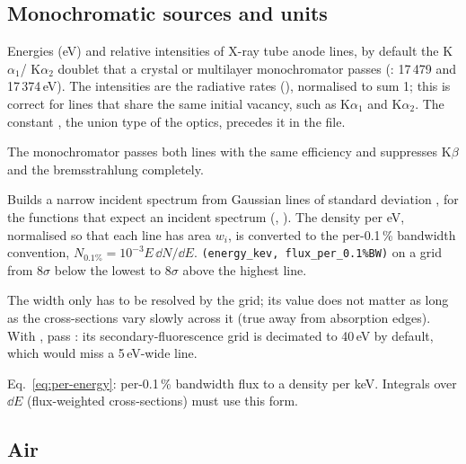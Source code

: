 \subsection{Monochromatic sources and units}

Energies (eV) and relative intensities of X-ray tube anode lines, by default the K$\alpha_1$/
K$\alpha_2$ doublet that a crystal or multilayer monochromator passes (:
17\,479 and 17\,374\,eV). The intensities are the radiative rates (), normalised
to sum 1; this is correct for lines that share the same initial vacancy, such as K$\alpha_1$
and K$\alpha_2$. The constant , the union type of the optics, precedes it
in the file.
\begin{hyp}
The monochromator passes both lines with the same efficiency and suppresses K$\beta$ and the
bremsstrahlung completely.
\end{hyp}

Builds a narrow incident spectrum from Gaussian lines of standard deviation ,
for the functions that expect an incident spectrum (,
). The density per eV, normalised so that each line has area $w_i$, is
converted to the per-0.1\,\% bandwidth convention, $N_{0.1\%} = 10^{-3}E\,\dd N/\dd E$.
 \texttt{(energy\_kev, flux\_per\_0.1\%BW)} on a grid from $8\sigma$ below the lowest to
$8\sigma$ above the highest line.
\begin{hyp}
The width only has to be resolved by the grid; its value does not matter as long as the
cross-sections vary slowly across it (true away from absorption edges). With
, pass : its secondary-fluorescence grid is
decimated to 40\,eV by default, which would miss a 5\,eV-wide line.
\end{hyp}

Eq.~\eqref{eq:per-energy}: per-0.1\,\% bandwidth flux to a density per keV. Integrals over
$\dd E$ (flux-weighted cross-sections) must use this form.

\subsection{Air}

